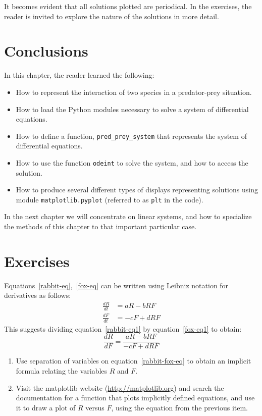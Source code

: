 It becomes evident that all solutions plotted are periodical. In the exercises, the reader is invited to explore the nature of the solutions in more detail.

\section{Conclusions}

In this chapter, the reader learned the following:
\begin{itemize}
\item How to represent the interaction of two species in a predator-prey situation.
\item How to load the Python modules necessary to solve a system of differential equations.
\item How to define a function, \texttt{pred\_prey\_system} that represents the system of differential equations.
\item How to use the function \texttt{odeint} to solve the system, and how to access the solution.
\item How to produce several different types of displays representing solutions using module \texttt{matplotlib.pyplot} (referred to as \texttt{plt} in the code).
\end{itemize}

In the next chapter we will concentrate on linear systems, and how to specialize the methods of this chapter to that important particular case.

\section{Exercises}

\begin{exercise} 
\label{ex-rabbit-fox-implicit}
Equations~\eqref{rabbit-eq},~\eqref{fox-eq} can be written using Leibniz notation for derivatives as follows:
\begin{align}
\label{rabbit-eq1}\frac{dR}{dt}&=aR-bRF\\
\label{fox-eq1}\frac{dF}{dt}&=-cF+dRF
\end{align}
This suggests dividing equation~\eqref{rabbit-eq1} by equation~\eqref{fox-eq1} to obtain:
\begin{equation}
\label{rabbit-fox-eq}
\frac{dR}{dF}=\frac{aR-bRF}{-cF+dRF}
\end{equation}
\begin{enumerate}
\item Use separation of variables on equation~\ref{rabbit-fox-eq} to obtain an implicit formula relating the variables $R$ and $F$.
\item Visit the matplotlib website (\url{http://matplotlib.org}) and search the documentation for a function that plots implicitly defined equations, and use it to draw a plot of $R$ versus $F$, using the equation from the previous item.
\end{enumerate}
\end{exercise}

